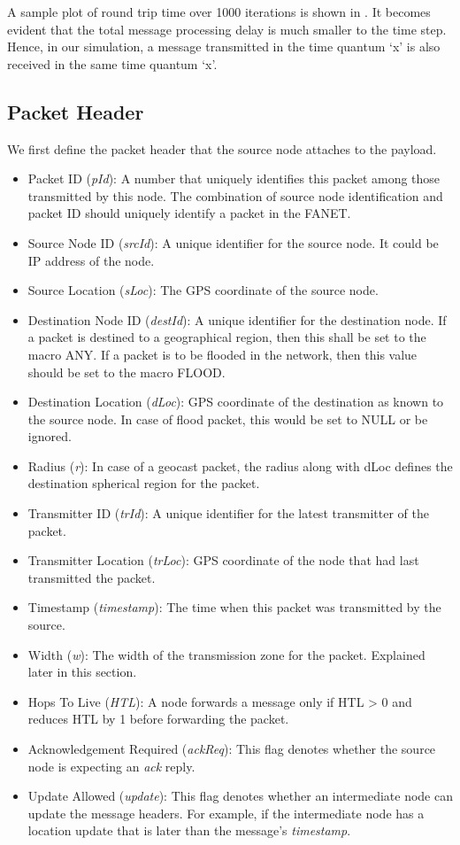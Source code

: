 A sample plot of round trip time over 1000 iterations is shown in . It becomes evident that the total message processing delay is much smaller to the time step. Hence, in our simulation, a message transmitted in the time quantum `x' is also received in the same time quantum `x'.

\subsection{Packet Header} \label{packet_header}
We first define the packet header that the source node attaches to the payload.
\begin{itemize}
\item Packet ID (\emph{pId}): A number that uniquely identifies this packet among those transmitted by this node. The combination of source node identification and packet ID should uniquely identify a packet in the FANET. 
\item Source Node ID (\emph{srcId}): A unique identifier for the source node. It could be IP address of the node.
\item Source Location (\emph{sLoc}): The GPS coordinate of the source node.
\item Destination Node ID (\emph{destId}): A unique identifier for the destination node. If a packet is destined to a geographical region, then this shall be set to the macro ANY. If a packet is to be flooded in the network, then this value should be set to the macro FLOOD. 
\item Destination Location (\emph{dLoc}): GPS coordinate of the destination as known to the source node. In case of flood packet, this would be set to NULL or be ignored. 
\item Radius (\emph{r}): In case of a geocast packet, the radius along with dLoc defines the destination spherical region for the packet.
\item Transmitter ID (\emph{trId}): A unique identifier for the latest transmitter of the packet.
\item Transmitter Location (\emph{trLoc}): GPS coordinate of the node that had last transmitted the packet.
\item Timestamp (\emph{timestamp}): The time when this packet was transmitted by the source.
\item Width (\emph{w}): The width of the transmission zone for the packet. Explained later in this section.
\item Hops To Live (\emph{HTL}): A node forwards a message only if HTL > 0 and reduces HTL by 1 before forwarding the packet. 
\item Acknowledgement Required (\emph{ackReq}): This flag denotes whether the source node is expecting an \emph{ack} reply.
\item Update Allowed (\emph{update}): This flag denotes whether an intermediate node can update the message headers. For example, if the intermediate node has a location update that is later than the message's \emph{timestamp}.

\end{itemize}


